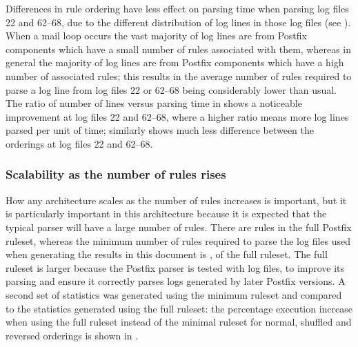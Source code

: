 
Differences in rule ordering have less effect on parsing time when parsing
log files 22 and 62--68, due to the different distribution of log lines in
those log files (see ).
When a mail loop occurs the vast majority of log lines are from Postfix
components which have a small number of rules associated with them, whereas
in general the majority of log lines are from Postfix components which have
a high number of associated rules; this results in the average number of
rules required to parse a log line from log files 22 or 62--68 being
considerably lower than usual.  The ratio of number of lines versus parsing
time in  shows a
noticeable improvement at log files 22 and 62--68, where a higher ratio
means more log lines parsed per unit of time; similarly  shows much less difference
between the orderings at log files 22 and 62--68.

\subsubsection{Scalability as the number of rules rises}

\label{scalability as the number of rules rises}

How any architecture scales as the number of rules increases is important,
but it is particularly important in this architecture because it is
expected that the typical parser will have a large number of rules.  There
are \numberOFrules{} rules in the full Postfix ruleset, whereas the minimum
number of rules required to parse the \numberOFlogFILES{} log files used
when generating the results in this document is \numberOFrulesMINIMUM{},
\numberOFrulesMINIMUMpercentage{} of the full ruleset.  The full ruleset is
larger because the Postfix parser is tested with \numberOFlogFILESall{} log
files, to improve its parsing and ensure it correctly parses logs generated
by later Postfix versions.  A second set of statistics was generated using
the minimum ruleset and compared to the statistics generated using the full
ruleset: the percentage execution increase when using the full ruleset
instead of the minimal ruleset for normal, shuffled and reversed orderings
is shown in .

